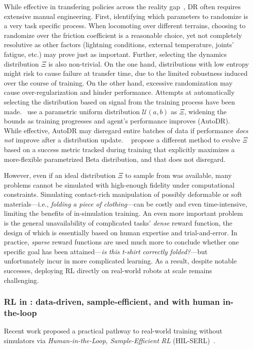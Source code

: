 While effective in transfering policies across the reality gap~\citep{jiDribbleBotDynamicLegged2023,tiboniDomainRandomizationEntropy2024}, DR often requires extensive manual engineering.
First, identifying which parameters to randomize is a very task specific process.
When locomoting over different terrains, choosing to randomize over the friction coefficient is a reasonable choice, yet not completely resolutive as other factors (lightning conditions, external temperature, joints' fatigue, etc.) may prove just as important.
Further, selecting the dynamics distribution \( \Xi \) is also non-trivial.
On the one hand, distributions with low entropy might risk to cause failure at transfer time, due to the limited robustness induced over the course of training.
On the other hand, excessive randomization may cause over-regularization and hinder performance.
Attempts at automatically selecting the distribution based on signal from the training process have been made.~\citet{openaiSolvingRubiksCube2019} use a parametric uniform distribution \( \mathcal U(a, b) \) as \( \Xi \), widening the bounds as training progresses and agent's performance improves (AutoDR). 
While effective, AutoDR may disregard entire batches of data if performance \emph{does not} improve after a distribution update.
~\citet{tiboniDomainRandomizationEntropy2024} propose a different method to evolve \( \Xi \) based on a success metric tracked during training that explicitly maximizes a more-flexible parametrized Beta distribution, and that does not disregard.

However, even if an ideal distribution \( \Xi \) to sample from was available, many problems cannot be simulated with high-enough fidelity under computational constraints.
Simulating contact-rich manipulation of possibly deformable or soft materials---i.e., \emph{folding a piece of clothing}---can be costly and even time-intensive, limiting the benefits of in-simulation training.
An even more important problem is the general unavailability of complicated tasks' \emph{dense} reward function, the design of which is essentially based on human expertise and trial-and-error.
In practice, \emph{sparse} reward functions are used much more to conclude whether one specific goal has been attained---\emph{is this t-shirt correctly folded?}---but unfortunately incur in more complicated learning.
As a result, despite notable successes, deploying RL directly on real-world robots at scale remains challenging.

\subsubsection{RL in \lerobot: data-driven, sample-efficient, and with human in-the-loop}
Recent work proposed a practical pathway to real-world training without simulators via \emph{Human-in-the-Loop, Sample-Efficient RL} (HIL-SERL)~\citep{luoPreciseDexterousRobotic2024}.

